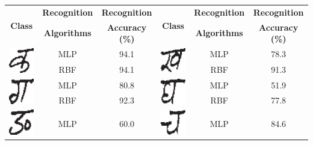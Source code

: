 \begin{table}[h]
\centering
\begin{tabular}{|c|c|c|c|c|c|}
\hline
\multirow{2}{*}{\textbf{Class}} & \textbf{Recognition} & \textbf{Recognition } & \multirow{2}{*}{\textbf{Class}} & \textbf{Recognition} & \textbf{Recognition }\tabularnewline
 & \textbf{Algorithms} & \textbf{Accuracy (\%)} &  & \textbf{Algorithms} & \textbf{Accuracy (\%)}\tabularnewline
\hline
\multirow{2}{*}{\includegraphics[scale=0.25]{figures/datasets/nhcr/consonants/1ka}} & MLP & 94.1 & \multirow{2}{*}{\includegraphics[scale=0.25]{figures/datasets/nhcr/consonants/2kha}} & MLP & 78.3\tabularnewline
\cline{2-3} \cline{5-6}
 & RBF & 94.1 &  & RBF & 91.3\tabularnewline
\hline
\multirow{2}{*}{\includegraphics[scale=0.25]{figures/datasets/nhcr/consonants/3ga}} & MLP & 80.8 & \multirow{2}{*}{\includegraphics[scale=0.25]{figures/datasets/nhcr/consonants/4gha}} & MLP & 51.9\tabularnewline
\cline{2-3} \cline{5-6}
 & RBF & 92.3 &  & RBF & 77.8\tabularnewline
\hline
\multirow{2}{*}{\includegraphics[scale=0.25]{figures/datasets/nhcr/consonants/5na}} & MLP & 60.0 & \multirow{2}{*}{\includegraphics[scale=0.25]{figures/datasets/nhcr/consonants/6cha}} & MLP & 84.6\tabularnewline

\end{tabular}
\end{table}
